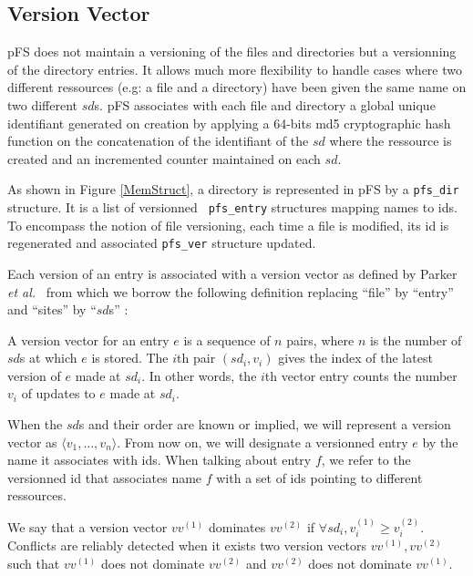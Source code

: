 \subsection{Version Vector}

pFS does not maintain a versioning of the files and directories but a
versionning of the directory entries. It allows much more flexibility
to handle cases where two different ressources (e.g: a file and a
directory) have been given the same name on two different $sd$s.  pFS
associates with each file and directory a global unique identifiant
generated on creation by applying a 64-bits md5 cryptographic hash
function on the concatenation of the identifiant of the $sd$ where the
ressource is created and an incremented counter maintained on each
$sd$. 

As shown in Figure \ref{MemStruct}, a directory is represented in pFS
by a {\tt pfs\_dir} structure. It is a list of versionned {\tt
  pfs\_entry} structures mapping names to ids. To encompass the notion
of file versioning, each time a file is modified, its id is
regenerated and associated {\tt pfs\_ver} structure updated.

Each version of an entry is associated with a version vector as
defined by Parker \emph{et al.}~\cite{parker:inconsistency} from which we
borrow the following definition replacing ``file'' by ``entry'' and
``sites'' by ``$sd$s'' :

\begin{definition}
A version vector for an entry $e$ is a sequence of $n$ pairs, where
$n$ is the number of $sd$s at which $e$ is stored. The $i$th pair
$(sd_{i}, v_{i})$ gives the index of the latest version of $e$ made at
$sd_{i}$. In other words, the $i$th vector entry counts the number
$v_{i}$ of updates to $e$ made at $sd_{i}$.
\end{definition}

When the $sd$s and their order are known or implied, we will represent a
version vector as $\langle v_{1}, ..., v_{n} \rangle$. From now on, we
will designate a versionned entry $e$ by the name it associates with
ids. When talking about entry $f$, we refer to the versionned id that
associates name $f$ with a set of ids pointing to different
ressources.

We say that a version vector $vv^{(1)}$ dominates $vv^{(2)}$ if
$\forall sd_{i}, v_{i}^{(1)} \geq v_{i}^{(2)}$. Conflicts are reliably
detected when it exists two version vectors $vv^{(1)}, vv^{(2)}$ such
that $vv^{(1)}$ does not dominate $vv^{(2)}$ and $vv^{(2)}$ does not
dominate $vv^{(1)}$. 


